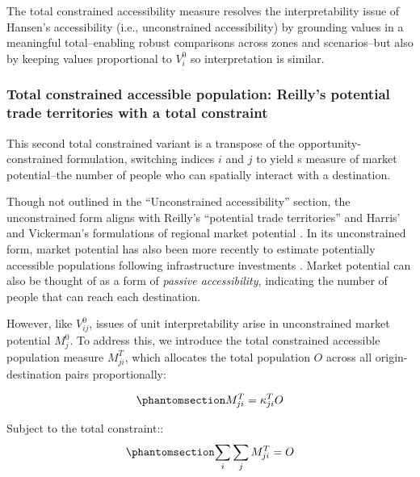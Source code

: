 \documentclass[
  10pt,
  letterpaper,
]{article}
\begin{document}
The total constrained accessibility measure resolves the
interpretability issue of Hansen's accessibility (i.e., unconstrained
accessibility) by grounding values in a meaningful total--enabling
robust comparisons across zones and scenarios--but also by keeping
values proportional to \(V_i^0\) so interpretation is similar.

\subsubsection{Total constrained accessible population: Reilly's
potential trade territories with a total
constraint}\label{total-constrained-accessible-population-reillys-potential-trade-territories-with-a-total-constraint}

This second total constrained variant is a transpose of the
opportunity-constrained formulation, switching indices \(i\) and \(j\)
to yield s measure of market potential--the number of people who can
spatially interact with a destination.

Though not outlined in the ``Unconstrained accessibility'' section, the
unconstrained form aligns with Reilly's ``potential trade territories''
\citep{reilly1929methods} and Harris' and Vickerman's formulations of
regional market potential
\citep{harris_market_1954, vickermanAccessibilityAttractionPotential1974}.
In its unconstrained form, market potential has also been more recently
to estimate potentially accessible populations following infrastructure
investments
\citep[e.g.,][]{gutierrezLocationEconomicPotential2001, holl2007twenty, condecco2018road}.
Market potential can also be thought of as a form of \emph{passive
accessibility}, indicating the number of people that can reach each
destination.

However, like \(V_{ij}^0\), issues of unit interpretability arise in
unconstrained market potential \(M_j^0\). To address this, we introduce
the total constrained accessible population measure \(M^T_{ji}\), which
allocates the total population \(O\) across all origin-destination pairs
proportionally:

\begin{equation}\phantomsection\label{eq-total-constrained-market}{
M^T_{ji} = \kappa_{ji}^T O
}\end{equation}

\noindent Subject to the total constraint::
\begin{equation}\phantomsection\label{eq-total-constraint-O}{
\sum_i \sum_j M^T_{ji} =  O
}\end{equation}
\end{document}
